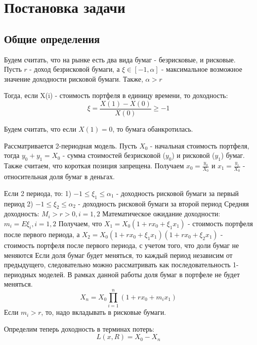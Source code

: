 \documentclass[14pt,a4paper]{article}
\theoremstyle{plain}
\theoremstyle{definition}
\begin{document}
 \section{Постановка задачи}


 \subsection{Общие определения}

\noindent Будем считать, что на рынке есть два вида бумаг - безрисковые, и рисковые. Пусть $r$ - доход безрисковой бумаги, а $\xi \in [-1, \alpha]$ - максимальное возможное значение доходности рисковой бумаги. Также, $\alpha > r$

Тогда, если X(i) - стоимость портфеля в единицу времени, то доходность:
$$
\xi = \frac{X(1)-X(0)}{X(0) }\ge -1
$$

Будем считать, что если $X(1)=0$, то бумага обанкротилась.
\vspace{1em}

Рассматривается 2-периодная модель. Пусть $X_0$ - начальная стоимость портфеля, тогда $y_0 + y_1 = X_0$ - сумма стоимостей безрисковой ($y_0$) и рисковой ($y_1$) бумаг. Также считаем, что короткая позиция запрещена. Получаем $x_0 = \frac{y_0}{X_0}$ и $x_1 = \frac{y_1}{X_0}$ - относительная доля бумаг в деньгах.

\vspace{5mm}
Если 2 периода, то:
1) $-1\le \xi_1 \le \alpha_1$ - доходность рисковой бумаги за первый период
2) $-1\le \xi_2 \le \alpha_2$ - доходность рисковой бумаги за второй период
\vspace{3mm}
Средняя доходность: $M_i>r>0, i =1,2$
Математическое ожидание доходности: $m_i = E\xi_i, i =1,2$
\vspace{3mm}
Получаем, что $X_1 = X_0(1+rx_0+\xi_1 x_1) $ - стоимость портфеля после первого периода, а $X_2 = X_0(1+rx_0+\xi_1 x_1)(1+rx_0+\xi_2 x_1) $ - стоимость портфеля после первого периода, с учетом того, что доли бумаг не меняются
\vspace{3mm}
Если доля бумаг будет меняться, то каждый период независим от предыдущего, следовательно можно рассматривать как последовательность 1-периодных моделей. В рамках данной работы доля бумаг в портфеле не будет меняться.
\vspace{3mm}
$$
X_n = X_0 \prod\limits_{i=1}^n (1+rx_0+m_i x_1)
$$
\vspace{3mm}
Если $m_i > r$, то, надо вкладывать в рисковые бумаги.

Определим теперь доходность в терминах потерь:
$$
L(x,R) = X_0 - X_n
$$
\end{document}
